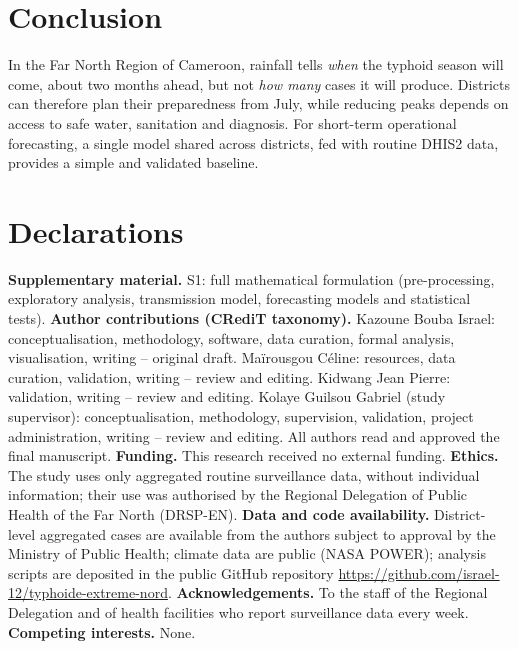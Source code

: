 \documentclass[11pt]{article}
\begin{document}
\section{Conclusion}
In the Far North Region of Cameroon, rainfall tells \textit{when} the typhoid season will come, about two months ahead, but not \textit{how many} cases it will produce. Districts can therefore plan their preparedness from July, while reducing peaks depends on access to safe water, sanitation and diagnosis. For short-term operational forecasting, a single model shared across districts, fed with routine DHIS2 data, provides a simple and validated baseline.

\section*{Declarations}
\small
\textbf{Supplementary material.} S1: full mathematical formulation (pre-processing, exploratory analysis, transmission model, forecasting models and statistical tests).
\textbf{Author contributions (CRediT taxonomy).} Kazoune Bouba Israel: conceptualisation, methodology, software, data curation, formal analysis, visualisation, writing -- original draft. Maïrousgou Céline: resources, data curation, validation, writing -- review and editing. Kidwang Jean Pierre: validation, writing -- review and editing. Kolaye Guilsou Gabriel (study supervisor): conceptualisation, methodology, supervision, validation, project administration, writing -- review and editing. All authors read and approved the final manuscript.
\textbf{Funding.} This research received no external funding.
\textbf{Ethics.} The study uses only aggregated routine surveillance data, without individual information; their use was authorised by the Regional Delegation of Public Health of the Far North (DRSP-EN).
\textbf{Data and code availability.} District-level aggregated cases are available from the authors subject to approval by the Ministry of Public Health; climate data are public (NASA POWER); analysis scripts are deposited in the public GitHub repository \url{https://github.com/israel-12/typhoide-extreme-nord}.
\textbf{Acknowledgements.} To the staff of the Regional Delegation and of health facilities who report surveillance data every week.
\textbf{Competing interests.} None.
\end{document}
